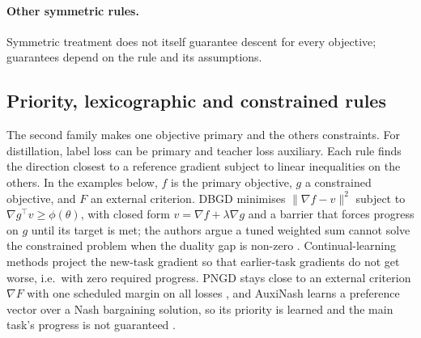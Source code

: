\paragraph{Other symmetric rules.}
Symmetric treatment does not itself guarantee descent for every objective; guarantees depend on the rule and its assumptions.

\subsection{Priority, lexicographic and constrained rules}
\label{sec:moo_priority}

The second family makes one objective primary and the others constraints. For distillation, label loss can be primary and teacher loss auxiliary. Each rule finds the direction closest to a reference gradient subject to linear inequalities on the others. In the examples below, $f$ is the primary objective, $g$ a constrained objective, and $F$ an external criterion.
DBGD minimises $\|\nabla f-v\|^2$ subject to $\nabla g^\top v\ge\phi(\theta)$, with closed form
$v=\nabla f+\lambda\nabla g$ and a barrier that forces progress on $g$ until its target is met; the authors argue a tuned weighted sum
cannot solve the constrained problem when the duality gap is non-zero \citep{gong2021dbgd}.
Continual-learning methods project the new-task gradient so that earlier-task gradients do not get
worse, i.e.\ with zero required progress.
PNGD stays close to an external criterion $\nabla F$ with one scheduled margin on all losses
\citep{ye2022pngd}, and AuxiNash learns a preference vector over a Nash bargaining solution, so
its priority is learned and the main task's progress is not guaranteed \citep{shamsian2023auxinash}.

